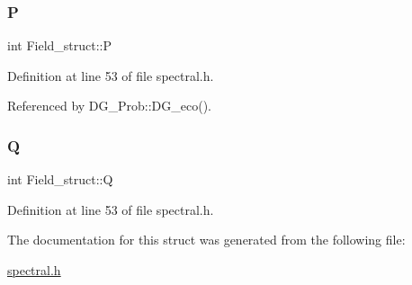 \subsubsection{\texorpdfstring{P}{P}}
{\footnotesize\ttfamily int Field\+\_\+struct\+::P}



Definition at line 53 of file spectral.\+h.



Referenced by D\+G\+\_\+\+Prob\+::\+D\+G\+\_\+eco().

\mbox{\label{structField__struct_a33955556d3e366de8c3d81b305c237f3}} 
\subsubsection{\texorpdfstring{Q}{Q}}
{\footnotesize\ttfamily int Field\+\_\+struct\+::Q}



Definition at line 53 of file spectral.\+h.



The documentation for this struct was generated from the following file\+:\begin{DoxyCompactItemize}
\item 
\hyperlink{spectral_8h}{spectral.\+h}\end{DoxyCompactItemize}
